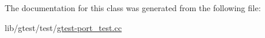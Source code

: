 The documentation for this class was generated from the following file\-:\begin{DoxyCompactItemize}
\item 
lib/gtest/test/\hyperlink{gtest-port__test_8cc}{gtest-\/port\-\_\-test.\-cc}\end{DoxyCompactItemize}
